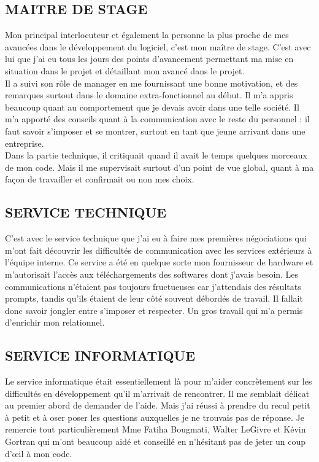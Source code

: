 \subsection{MAITRE DE STAGE}
Mon principal interlocuteur et également la personne la plus proche de mes avancées dans le développement du logiciel, c’est mon maître de stage. C’est avec lui que j’ai eu tous les jours des points d’avancement permettant ma mise en situation dans le projet et détaillant mon avancé dans le projet. \\

Il a suivi son rôle de manager en me fournissant une bonne motivation, et des remarques surtout dans le domaine extra-fonctionnel au début. Il m’a appris beaucoup quant au comportement que je devais avoir dans une telle société. Il m’a apporté des conseils quant à la communication avec le reste du personnel : il faut savoir s’imposer et se montrer, surtout en tant que jeune arrivant dans une entreprise.\\

Dans la partie technique, il critiquait quand il avait le temps quelques morceaux de mon code. Mais il me supervisait surtout d’un point de vue global, quant à ma façon de travailler et confirmait ou non mes choix.\\

\subsection{SERVICE TECHNIQUE}
C’est avec le service technique que j’ai eu à faire mes premières négociations qui m’ont fait découvrir les difficultés de communication avec les services extérieurs à l’équipe interne. Ce service a été en quelque sorte mon fournisseur de hardware et m’autorisait l’accès aux téléchargements des softwares dont j’avais besoin. Les communications n’étaient pas toujours fructueuses car j’attendais des résultats prompts, tandis qu’ils étaient de leur côté souvent débordés de travail. Il fallait donc savoir jongler entre s’imposer et respecter. Un gros travail qui m’a permis d’enrichir mon relationnel.\\

\subsection{SERVICE INFORMATIQUE}
Le service informatique était essentiellement là pour m’aider concrètement sur les difficultés en développement qu’il m’arrivait de rencontrer. Il me semblait délicat au premier abord de demander de l’aide. Mais j’ai réussi à prendre du recul petit à petit et à oser poser les questions auxquelles je ne trouvais pas de réponse. Je remercie tout particulièrement Mme Fatiha Bougmati, Walter LeGivre et Kévin Gortran qui m’ont beaucoup aidé et conseillé en n’hésitant pas de jeter un coup d’œil à mon code.\\

